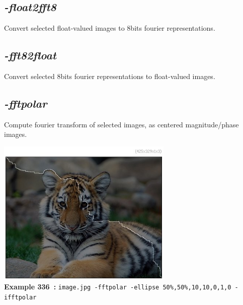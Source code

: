 \documentclass[a4paper,11pt,twoside]{book}
\begin{document}
\subsection{\emph{-float2fft8} }\vspace*{-0.5em}
Convert selected float-valued images to 8bits fourier representations.


\subsection{\emph{-fft82float} }\vspace*{-0.5em}
Convert selected 8bits fourier representations to float-valued images.


\subsection{\emph{-fftpolar} }\vspace*{-0.5em}
Compute fourier transform of selected images, as centered magnitude/phase images.
\begin{center}\includegraphics[keepaspectratio=true,height=7cm,width=\textwidth]{img/gmic_def336.jpg}\\
{\footnotesize \textbf{Example 336~:} \texttt{image.jpg -fftpolar -ellipse 50\%,50\%,10,10,0,1,0 -ifftpolar}}
\end{center}
\end{document}
